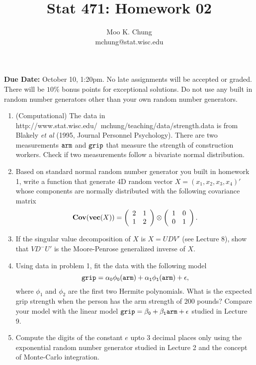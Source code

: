 \documentclass[12pt]{article} %
\begin{document}
\title{Stat 471: Homework 02}
\author{Moo K. Chung\\
mchung@stat.wisc.edu}
\maketitle \thispagestyle{empty}

{\bf Due Date:} October 10, 1:20pm. No late assignments will be
accepted or graded. There will be $10\%$ bonus points for
exceptional solutions. Do not use any built in random number
generators other than your own random number generators.

\begin{enumerate}

\item (Computational) The data in
http://www.stat.wisc.edu/~mchung/teaching/data/strength.data is
from Blakely {\em et al} (1995, Journal Personnel Psychology).
There are two measurements $\tt{arm}$ and $\tt{grip}$ that measure
the strength of construction workers. Check if two measurements
follow a bivariate normal distribution.

\item Based on standard normal random number generator you built
in homework 1, write a function that generate 4D random vector
$X=(x_1,x_2,x_3,x_4)'$ whose components are normally distributed
with the following covariance matrix
$${\bf Cov}({\bf vec}(X))= \left(%
\begin{array}{cc}
  2 & 1 \\
  1 & 2 \\
\end{array}%
\right) \otimes \left(%
\begin{array}{cc}
  1 & 0 \\
  0 & 1 \\
\end{array}%
\right).$$


\item If the singular value decomposition of $X$ is $X=UDV'$ (see
Lecture 8), show that $VD^{-}U'$ is the Moore-Penrose generalized
inverse of $X$.

\item Using data in problem 1, fit the data with the following
model $$\tt{grip} = \alpha_0\phi_0(\tt{arm}) +
\alpha_1\phi_1(\tt{arm}) + \epsilon,$$ where $\phi_1$ and $\phi_2$
are the first two Hermite polynomials. What is the expected grip
strength when the person has the arm strength of $200$ pounds?
Compare your model with the linear model $\tt{grip}= \beta_0 +
\beta_1 \tt{arm} + \epsilon$ studied in Lecture 9.

\item Compute the digits of the constant $e$ upto 3 decimal places
only using the exponential random number generator studied in
Lecture 2 and the concept of Monte-Carlo integration.
\end{enumerate}
\end{document}
